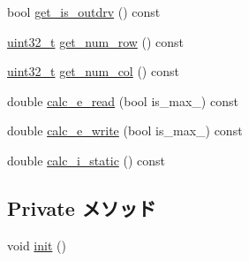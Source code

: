 \begin{DoxyCompactItemize}
\item 
bool \hyperlink{classSRAM_aeae566aacd01a41f66fda87cb0fd9778}{get\_\-is\_\-outdrv} () const 
\item 
\hyperlink{Type_8hh_a435d1572bf3f880d55459d9805097f62}{uint32\_\-t} \hyperlink{classSRAM_a870b30e2a9145eeda64c820e9f43c74e}{get\_\-num\_\-row} () const 
\item 
\hyperlink{Type_8hh_a435d1572bf3f880d55459d9805097f62}{uint32\_\-t} \hyperlink{classSRAM_aeaeab0740a324ed17fdab95be3a01e27}{get\_\-num\_\-col} () const 
\item 
double \hyperlink{classSRAM_a3308b493960fdd7d2a292786eaba976c}{calc\_\-e\_\-read} (bool is\_\-max\_\-) const 
\item 
double \hyperlink{classSRAM_a3ea79b0e93868572161314a61e384360}{calc\_\-e\_\-write} (bool is\_\-max\_\-) const 
\item 
double \hyperlink{classSRAM_aad1d8e72e5083614a20373b700754f6a}{calc\_\-i\_\-static} () const 
\end{DoxyCompactItemize}
\subsection*{Private メソッド}
\begin{DoxyCompactItemize}
\item 
void \hyperlink{classSRAM_a02fd73d861ef2e4aabb38c0c9ff82947}{init} ()
\end{DoxyCompactItemize}
